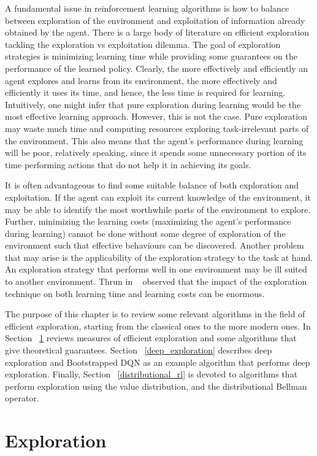 A fundamental issue in reinforcement learning algorithms is how to balance between exploration of the environment and exploitation of information already obtained by the agent. There is a large body of literature on efficient exploration tackling the exploration vs exploitation dilemma. The goal of exploration strategies is minimizing learning time while providing some guarantees on the performance of the learned policy. Clearly, the more effectively and efficiently an agent explores and learns from its environment, the more effectively and efficiently it uses its time, and hence, the less time is required for learning. Intuitively, one might infer that pure exploration during learning would be the most effective learning approach. However, this is not the case. Pure exploration may waste much time and computing resources exploring task-irrelevant parts of the environment. This also means that the agent's performance during learning will be poor, relatively speaking, since it spends some unnecessary portion of its time performing actions that do not help it in achieving its goals. \par
It is often advantageous to find some suitable balance of both exploration and exploitation. If the agent can exploit its current knowledge of the environment, it may be able to identify the most worthwhile parts of the environment to explore. Further, minimizing the learning costs (\ie maximizing the agent's performance during learning) cannot be done without some degree of exploration of the environment such that effective behaviours can be discovered. 
Another problem that may arise is the applicability of the exploration strategy to the task at hand. An exploration strategy that performs well in one environment may be ill suited to another environment. Thrun in ~\cite{Thrun92efficientexploration} observed that the impact of the exploration technique on both learning time and learning costs can be enormous. \par
The purpose of this chapter is to review some relevant algorithms in the field of efficient exploration, starting from the classical ones to the more modern ones. In Section ~\ref{exploration} reviews measures of efficient exploration and some algorithms that give theoretical guarantees. Section ~\ref{deep_exploration} describes deep exploration and Bootstrapped DQN as an example algorithm that performs deep exploration. Finally, Section ~\ref{distributional_rl} is devoted to algorithms that perform exploration using the value distribution, and the distributional Bellman operator.
\section{Exploration} \label{exploration}
